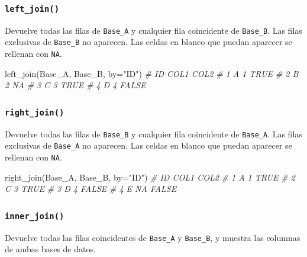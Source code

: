 \documentclass[
]{article}
\newenvironment{Shaded}{\begin{snugshade}}{\end{snugshade}}
\newcommand{\AttributeTok}[1]{\textcolor[rgb]{0.77,0.63,0.00}{#1}}
\newcommand{\CommentTok}[1]{\textcolor[rgb]{0.56,0.35,0.01}{\textit{#1}}}
\newcommand{\FunctionTok}[1]{\textcolor[rgb]{0.00,0.00,0.00}{#1}}
\newcommand{\NormalTok}[1]{#1}
\newcommand{\StringTok}[1]{\textcolor[rgb]{0.31,0.60,0.02}{#1}}
\theoremstyle{definition}
\theoremstyle{definition}
\theoremstyle{definition}
\theoremstyle{definition}
\theoremstyle{remark}
\begin{document}
\hypertarget{left_join}{%
\subsubsection{\texorpdfstring{\texttt{left\_join()}}{left\_join()}}\label{left_join}}

Devuelve todas las filas de \texttt{Base\_A} y cualquier fila coincidente de \texttt{Base\_B}. Las filas exclusivas de \texttt{Base\_B} no aparecen. Las celdas en blanco que puedan aparecer se rellenan con \texttt{NA}.

\begin{Shaded}
\begin{Highlighting}[]
\FunctionTok{left\_join}\NormalTok{(Base\_A, Base\_B, }\AttributeTok{by=}\StringTok{"ID"}\NormalTok{)}
\CommentTok{\#   ID COL1  COL2}
\CommentTok{\# 1  A    1  TRUE}
\CommentTok{\# 2  B    2    NA}
\CommentTok{\# 3  C    3  TRUE}
\CommentTok{\# 4  D    4 FALSE}
\end{Highlighting}
\end{Shaded}

\hypertarget{right_join}{%
\subsubsection{\texorpdfstring{\texttt{right\_join()}}{right\_join()}}\label{right_join}}

Devuelve todas las filas de \texttt{Base\_B} y cualquier fila coincidente de \texttt{Base\_A}. Las filas exclusivas de \texttt{Base\_A} no aparecen. Las celdas en blanco que puedan aparecer se rellenan con \texttt{NA}.

\begin{Shaded}
\begin{Highlighting}[]
\FunctionTok{right\_join}\NormalTok{(Base\_A, Base\_B, }\AttributeTok{by=}\StringTok{"ID"}\NormalTok{)}
\CommentTok{\#   ID COL1  COL2}
\CommentTok{\# 1  A    1  TRUE}
\CommentTok{\# 2  C    3  TRUE}
\CommentTok{\# 3  D    4 FALSE}
\CommentTok{\# 4  E   NA FALSE}
\end{Highlighting}
\end{Shaded}

\hypertarget{inner_join}{%
\subsubsection{\texorpdfstring{\texttt{inner\_join()}}{inner\_join()}}\label{inner_join}}

Devuelve todas las filas coincidentes de \texttt{Base\_A} y \texttt{Base\_B}, y muestra las columnas de ambas bases de datos.
\end{document}

